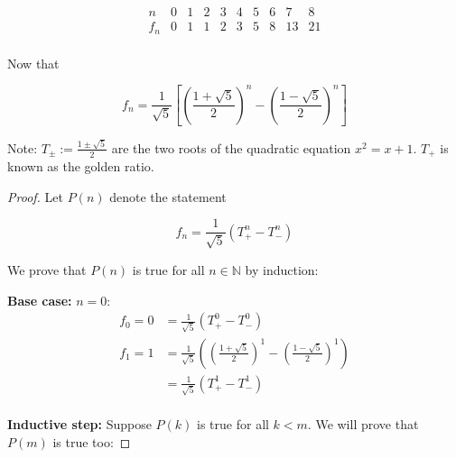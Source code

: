 \documentclass[11pt]{article}
\begin{document}
\begin{enumerate}
          \[
              \begin{array}{c|c|c|c|c|c|c|c|c|c}
                  n   & 0 & 1 & 2 & 3 & 4 & 5 & 6 & 7  & 8  \\
                  \hline
                  f_n & 0 & 1 & 1 & 2 & 3 & 5 & 8 & 13 & 21 \\
              \end{array}
          \]

          Now that

          \[
              f_n = \frac{1}{\sqrt{5}} \left[ \left( \frac{1 + \sqrt{5}}{2} \right)^n - \left( \frac{1 - \sqrt{5}}{2} \right)^n \right]
          \]

          Note: $T_{\pm} := \frac{1 \pm \sqrt{5}}{2}$ are the two roots of the quadratic
          equation $x^2 = x + 1$. $T_+$ is known as the golden ratio.

          \begin{proof}

              Let $P(n)$ denote the statement

              \[
                  f_n = \frac{1}{\sqrt{5}} \left( T_+^n - T_-^n \right)
              \]

              We prove that $P(n)$ is true for all $n \in \mathbb{N}$ by induction:

              \textbf{Base case:} $n = 0$:
              \[
                  \begin{aligned}
                      f_0 = 0 & = \frac{1}{\sqrt{5}} \left( T_+^0 - T_-^0 \right)                                                                     \\
                      f_1 = 1 & = \frac{1}{\sqrt{5}} \left( \left( \frac{1 + \sqrt{5}}{2} \right)^1 - \left( \frac{1 - \sqrt{5}}{2} \right)^1 \right) \\
                              & = \frac{1}{\sqrt{5}} \left( T_+^1 - T_-^1 \right)
                  \end{aligned}
              \]
              \\\textbf{Inductive step:} Suppose $P(k)$ is true for all $k < m$. We will prove that $P(m)$ is true too:


\end{proof}
\end{enumerate}
\end{document}
